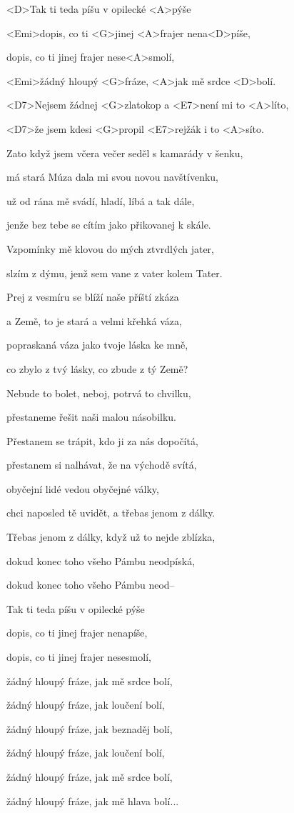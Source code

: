 

\zs
<D>Tak ti teda píšu v opilecké <A>pýše

<Emi>dopis, co ti <G>jinej <A>frajer nena<D>píše,

dopis, co ti jinej frajer nese<A>smolí,

<Emi>žádný hloupý <G>fráze, <A>jak mě srdce <D>bolí.
\ks

\zr
<D7>Nejsem žádnej <G>zlatokop a <E7>není mi to <A>líto,

<D7>že jsem kdesi <G>propil <E7>rejžák i to <A>síto.
\kr

\zs
Zato když jsem včera večer seděl s kamarády v šenku,

má stará Múza dala mi svou novou navštívenku,

už od rána mě svádí, hladí, líbá a tak dále,

jenže bez tebe se cítím jako přikovanej k skále.
\ks

\zr
Vzpomínky mě klovou do mých ztvrdlých jater,

slzím z dýmu, jenž sem vane z vater kolem Tater.
\kr

\zs
Prej z vesmíru se blíží naše příští zkáza

a Země, to je stará a velmi křehká váza,

popraskaná váza jako tvoje láska ke mně,

co zbylo z tvý lásky, co zbude z tý Země?
\ks

\zr
Nebude to bolet, neboj, potrvá to chvilku,

přestaneme řešit naši malou násobilku.
\kr

\zs
Přestanem se trápit, kdo ji za nás dopočítá,

přestanem si nalhávat, že na východě svítá,

obyčejní lidé vedou obyčejné války,

chci naposled tě uvidět, a třebas jenom z dálky.
\ks

\zs
Třebas jenom z dálky, když už to nejde zblízka,

dokud konec toho všeho Pámbu neodpíská,

dokud konec toho všeho Pámbu neod--
\ks

\zs
Tak ti teda píšu v opilecké pýše

dopis, co ti jinej frajer nenapíše,

dopis, co ti jinej frajer nesesmolí,

žádný hloupý fráze, jak mě srdce bolí,

žádný hloupý fráze, jak loučení bolí,

žádný hloupý fráze, jak beznaděj bolí,

žádný hloupý fráze, jak loučení bolí,

žádný hloupý fráze, jak mě srdce bolí,

žádný hloupý fráze, jak mě hlava bolí...
\ks

\kp
